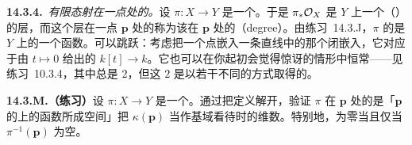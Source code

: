 \textbf{14.3.4.}\ \emph{有限态射在一点处的\trDegree。}\quad 设 $\pi\colon X\to Y$ 是一个\trFinite\trMorphism。于是 $\pi_*\mathcal{O}_X$ 是 $Y$ 上一个\trFiniteType{}（\trQC）的层，而这个层在一点 $\mathbf{p}$ 处的\trRank{}称为该\trFinite\trMorphism{}在 $\mathbf{p}$ 处的\textbf{\trDegree}（degree）。由\mbox{练习~14.3.J}，$\pi$ 的\trDegree{}是 $Y$ 上的一个\trUpperSemicontinuous{}函数。\trDegree{}可以跳跃：考虑把一个点嵌入一条直线中的那个闭嵌入，它对应于由 $t\mapsto 0$ 给出的 $k[t]\to k$。它也可以在你起初会觉得惊讶的情形中恒常——见\mbox{练习~10.3.4}，其中\trDegree{}总是 $2$，但这 $2$ 是以若干不同的方式取得的。

\textbf{14.3.M.（练习）}\quad 设 $\pi\colon X\to Y$ 是一个\trFinite\trMorphism。通过把定义解开，验证 $\pi$ 在 $\mathbf{p}$ 处的\trDegree{}是「$\mathbf{p}$ 的\trSchemeTheoreticPreimage{}上的函数所成空间」把\trResidueField{} $\kappa(\mathbf{p})$ 当作基域看待时的维数。特别地，\trDegree{}为零当且仅当 $\pi^{-1}(\mathbf{p})$ 为空。
